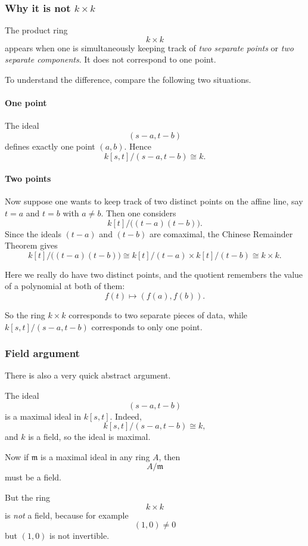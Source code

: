 \documentclass[12pt,a4paper]{article}
\theoremstyle{notespace}
\theoremstyle{definition}
\begin{document}
\subsubsection{Why it is not \(k\times k\)}

The product ring
\[
k\times k
\]
appears when one is simultaneously keeping track of \emph{two separate points} or \emph{two separate components}. It does not correspond to one point.

To understand the difference, compare the following two situations.

\paragraph{One point}

The ideal
\[
(s-a,t-b)
\]
defines exactly one point \((a,b)\). Hence
\[
k[s,t]/(s-a,t-b)\cong k.
\]

\paragraph{Two points}

Now suppose one wants to keep track of two distinct points on the affine line, say \(t=a\) and \(t=b\) with \(a\neq b\). Then one considers
\[
k[t]/\bigl((t-a)(t-b)\bigr).
\]
Since the ideals \((t-a)\) and \((t-b)\) are comaximal, the Chinese Remainder Theorem gives
\[
k[t]/\bigl((t-a)(t-b)\bigr)
\cong
k[t]/(t-a)\times k[t]/(t-b)
\cong
k\times k.
\]

Here we really do have two distinct points, and the quotient remembers the value of a polynomial at both of them:
\[
f(t)\mapsto (f(a),f(b)).
\]

So the ring \(k\times k\) corresponds to two separate pieces of data, while \(k[s,t]/(s-a,t-b)\) corresponds to only one point.

\subsubsection{Field argument}

There is also a very quick abstract argument.

The ideal
\[
(s-a,t-b)
\]
is a maximal ideal in \(k[s,t]\). Indeed,
\[
k[s,t]/(s-a,t-b)\cong k,
\]
and \(k\) is a field, so the ideal is maximal.

Now if \(\mathfrak m\) is a maximal ideal in any ring \(A\), then
\[
A/\mathfrak m
\]
must be a field.

But the ring
\[
k\times k
\]
is \emph{not} a field, because for example
\[
(1,0)\neq 0
\]
but \((1,0)\) is not invertible.
\end{document}
